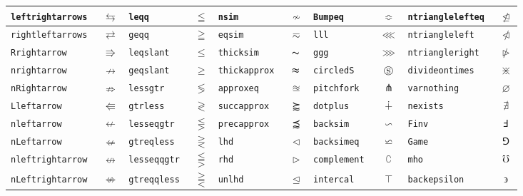 \documentclass[10pt]{article}
\def\bs{\tt\char92}
\begin{document}
{\begin{tabular}{|l|c||l|c||l|c||l|c||l|c|}
     \bs leftrightarrows    &$\leftrightarrows    $ & \bs leqq             &$\leqq             $& \bs nsim             &$\nsim             $ &\bs Bumpeq            &$\Bumpeq            $& \bs ntrianglelefteq &$\ntrianglelefteq $\\   \hline
     \bs rightleftarrows    &$\rightleftarrows    $ & \bs geqq             &$\geqq             $& \bs eqsim            &$\eqsim            $ &\bs lll               &$\lll               $& \bs ntriangleleft   &$\ntriangleleft   $\\   \hline
     \bs Rrightarrow        &$\Rrightarrow        $ & \bs leqslant         &$\leqslant         $& \bs thicksim         &$\thicksim         $ &\bs ggg               &$\ggg               $& \bs ntriangleright  &$\ntriangleright  $\\   \hline
     \bs nrightarrow        &$\nrightarrow        $ & \bs geqslant         &$\geqslant         $& \bs thickapprox      &$\thickapprox      $ &\bs circledS          &$\circledS          $& \bs divideontimes   &$\divideontimes   $\\   \hline
     \bs nRightarrow        &$\nRightarrow        $ & \bs lessgtr          &$\lessgtr          $& \bs approxeq         &$\approxeq         $ &\bs pitchfork         &$\pitchfork         $& \bs varnothing      &$\varnothing      $\\   \hline
     \bs Lleftarrow         &$\Lleftarrow         $ & \bs gtrless          &$\gtrless          $& \bs succapprox       &$\succapprox       $ &\bs dotplus           &$\dotplus           $& \bs nexists         &$\nexists         $\\   \hline
     \bs nleftarrow         &$\nleftarrow         $ & \bs lesseqgtr        &$\lesseqgtr        $& \bs precapprox       &$\precapprox       $ &\bs backsim           &$\backsim           $& \bs Finv            &$\Finv            $\\   \hline
     \bs nLeftarrow         &$\nLeftarrow         $ & \bs gtreqless        &$\gtreqless        $& \bs lhd              &$\lhd              $ &\bs backsimeq         &$\backsimeq         $& \bs Game            &$\Game            $\\   \hline
     \bs nleftrightarrow    &$\nleftrightarrow    $ & \bs lesseqqgtr       &$\lesseqqgtr       $& \bs rhd              &$\rhd              $ &\bs complement        &$\complement        $& \bs mho             &$\mho             $\\   \hline
     \bs nLeftrightarrow    &$\nLeftrightarrow    $ & \bs gtreqqless       &$\gtreqqless       $& \bs unlhd            &$\unlhd            $ &\bs intercal          &$\intercal          $& \bs backepsilon     &$\backepsilon     $\\   \hline

\end{tabular}}
\end{document}
